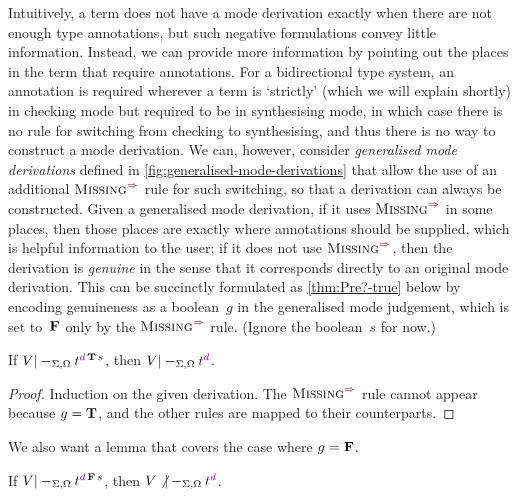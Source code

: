 Intuitively, a term does not have a mode derivation exactly when there are not enough type annotations, but such negative formulations convey little information.%
Instead, we can provide more information by pointing out the places in the term that require annotations.
For a bidirectional type system, an annotation is required wherever a term is `strictly' (which we will explain shortly) in checking mode but required to be in synthesising mode, in which case there is no rule for switching from checking to synthesising, and thus there is no way to construct a mode derivation.
We can, however, consider \emph{generalised mode derivations} defined in \cref{fig:generalised-mode-derivations} that allow the use of an additional $\SynRule{Missing}$ rule for such switching, so that a derivation can always be constructed.
Given a generalised mode derivation, if it uses $\SynRule{Missing}$ in some places, then those places are exactly where annotations should be supplied, which is helpful information to the user; if it does not use $\SynRule{Missing}$, then the derivation is \emph{genuine} in the sense that it corresponds directly to an original mode derivation.
This can be succinctly formulated as \cref{thm:Pre?-true} below by encoding genuineness as a boolean~$g$ in the generalised mode judgement, which is set to~$\mathbf{F}$ only by the $\SynRule{Missing}$ rule.
(Ignore the boolean~$s$ for now.)

\begin{lemma}\label{thm:Pre?-true}
If\/ $V |-_{\Sigma,\Omega} t^{\dir{d}\,\True\,s}$, then $V |-_{\Sigma,\Omega} t^\dir{d}$.
\end{lemma}

\begin{proof}
Induction on the given derivation.
The $\SynRule{Missing}$ rule cannot appear because $g = \mathbf{T}$, and the other rules are mapped to their counterparts.
\end{proof}

We also want a lemma that covers the case where $g = \mathbf{F}$.

\begin{lemma}\label{thm:Pre?-false}
If\/ $V |-_{\Sigma,\Omega} t^{\dir{d}\,\False\,s}$, then $V \not|-_{\Sigma,\Omega} t^\dir{d}$.
\end{lemma}

